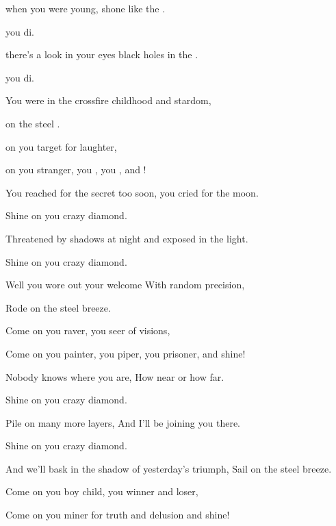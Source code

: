 

\zs
{} when you were young,
 shone like the .

  you   di.

 there's a look in your eyes
 black holes in the .

  you   di.

You were  in the crossfire
 childhood and stardom,

 on the steel .

 on you target for  laughter,

 on you stranger, you , you , and !
\ks

      

\zs
You reached for the secret too soon,
you cried for the moon.

Shine on you crazy diamond.

Threatened by shadows at night
and exposed in the light.

Shine on you crazy diamond.

Well you wore out your welcome
With random precision,

Rode on the steel breeze.

Come on you raver, you seer of visions,

Come on you painter, you piper, you prisoner, and shine!
\ks

\zs
Nobody knows where you are,
How near or how far.

Shine on you crazy diamond.

Pile on many more layers,
And I'll be joining you there.

Shine on you crazy diamond.

And we'll bask in the shadow of yesterday's triumph,
Sail on the steel breeze.

Come on you boy child, you winner and loser,

Come on you miner for truth and delusion and shine!
\ks

\kp





